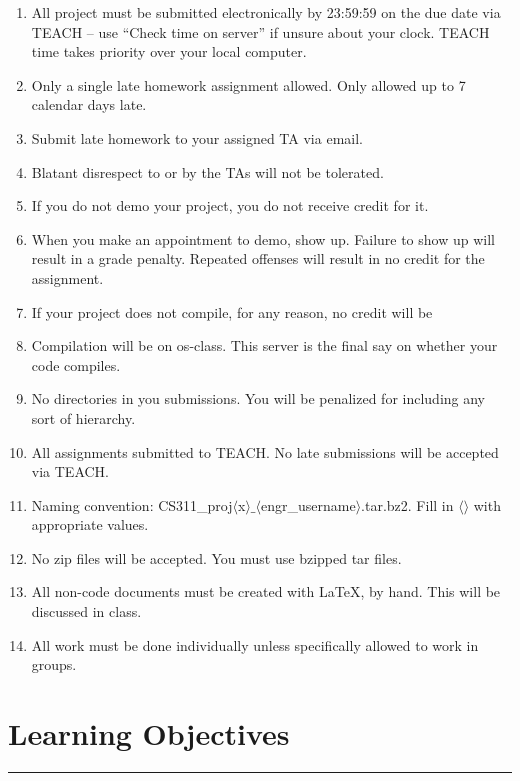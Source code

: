 \documentclass[letterpaper,10pt,titlepage]{article}
\begin{document}
\begin{enumerate}
    \item All project must be submitted electronically by 23:59:59 on the due
          date via TEACH -- use ``Check time on server'' if unsure about
          your clock. TEACH time takes priority over your local
          computer.
    \item Only a single late homework assignment allowed. Only allowed up to 7 calendar days late.
    \item Submit late homework to your assigned TA via email.
    \item Blatant disrespect to or by the TAs will not be tolerated.
    \item If you do not demo your project, you do not receive credit for it.
    \item When you make an appointment to demo, show up. Failure to show up
          will result in a grade penalty.  Repeated offenses will result in no credit for
          the assignment.
    \item If your project does not compile, for any reason, no credit will be
    \item Compilation will be on os-class. This server is the final say on whether your code compiles.
    \item No directories in you submissions. You will be penalized for
          including any sort of hierarchy.
    \item All assignments submitted to TEACH. No late submissions will be accepted via TEACH.
    \item Naming convention:
          CS311\_proj$\langle$x$\rangle\_\langle$engr\_username$\rangle$.tar.bz2.
          Fill in $\langle\rangle$ with appropriate values.
    \item No zip files will be accepted. You must use bzipped tar files.
    \item All non-code documents must be created with LaTeX, by hand. This
          will be discussed in class.
    \item All work must be done individually unless specifically allowed to work in groups.
\end{enumerate}

\section*{Learning Objectives}
\hrule
\end{document}
